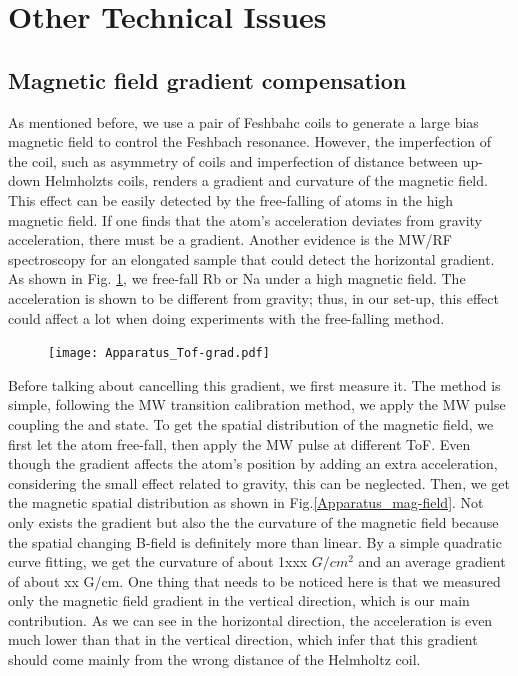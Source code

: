 \section{Other Technical Issues}
\subsection{Magnetic field gradient compensation}
\label{subsec:gradientcompen}
As mentioned before, we use a pair of Feshbahc coils to generate a large bias magnetic field to control the Feshbach resonance. However,  the imperfection of the coil, such as asymmetry of coils and imperfection of distance between up-down Helmholzts coils, renders a gradient and curvature of the magnetic field. This effect can be easily detected by the free-falling of atoms in the high magnetic field. If one finds that the atom's acceleration deviates from gravity acceleration, there must be a gradient. Another evidence is the MW/RF spectroscopy for an elongated sample that could detect the horizontal gradient. As shown in Fig. \ref{Apparatus_Tof-grad}, we free-fall Rb or Na under a high magnetic field. The acceleration is shown to be different from gravity; thus, in our set-up, this effect could affect a lot when doing experiments with the free-falling method.

\begin{figure}[htbp]
\begin{center}
\texttt{[image: Apparatus\_Tof-grad.pdf]}
\end{center}
\caption[Fast coil, main coil and environment]{}
\label{Apparatus_Tof-grad}
\end{figure}

Before talking about cancelling this gradient, we first measure it. The method is simple, following the MW transition calibration method, we apply the MW pulse coupling the  and  state. To get the spatial distribution of the magnetic field, we first let the atom free-fall, then apply the MW pulse at different ToF. Even though the gradient affects the atom's position by adding an extra acceleration, considering the small effect related to gravity, this can be neglected. Then, we get the magnetic spatial distribution as shown in Fig.\ref{Apparatus_mag-field}. Not only exists the gradient but also the the curvature of the magnetic field because the spatial changing B-field is definitely more than linear. By a simple quadratic curve fitting, we get the curvature of about 1xxx \(G/cm^2\) and an average gradient of about xx G/cm. One thing that needs to be noticed here is that we measured only the magnetic field gradient in the vertical direction, which is our main contribution. As we can see in the horizontal direction, the acceleration is even much lower than that in the vertical direction, which infer that this gradient should come mainly from the wrong distance of the Helmholtz coil.

